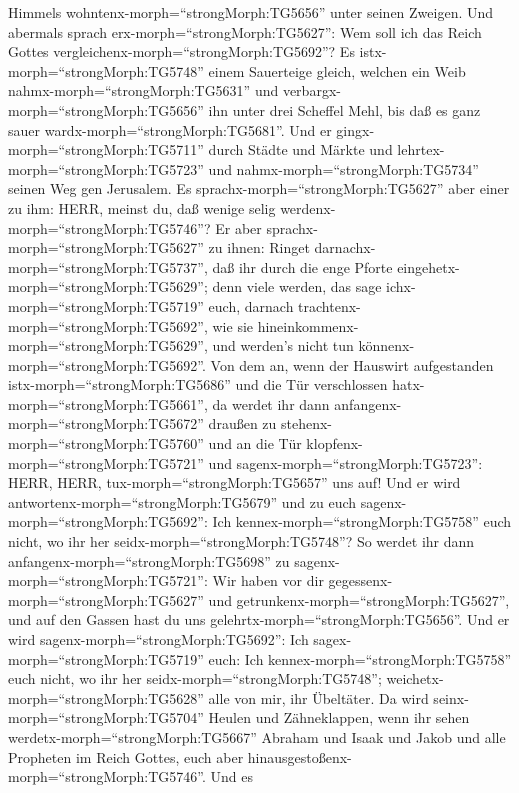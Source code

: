 Himmels wohntenx-morph=``strongMorph:TG5656'' unter seinen Zweigen.
 Und abermals sprach erx-morph=``strongMorph:TG5627'': Wem
soll ich das Reich Gottes vergleichenx-morph=``strongMorph:TG5692''?
 Es istx-morph=``strongMorph:TG5748'' einem Sauerteige
gleich, welchen ein Weib nahmx-morph=``strongMorph:TG5631'' und
verbargx-morph=``strongMorph:TG5656'' ihn unter drei Scheffel Mehl, bis
daß es ganz sauer wardx-morph=``strongMorph:TG5681''.  Und
er gingx-morph=``strongMorph:TG5711'' durch Städte und Märkte und
lehrtex-morph=``strongMorph:TG5723'' und
nahmx-morph=``strongMorph:TG5734'' seinen Weg gen Jerusalem.
 Es sprachx-morph=``strongMorph:TG5627'' aber einer zu ihm:
HERR, meinst du, daß wenige selig werdenx-morph=``strongMorph:TG5746''?
Er aber sprachx-morph=``strongMorph:TG5627'' zu ihnen: 
Ringet darnachx-morph=``strongMorph:TG5737'', daß ihr durch die enge
Pforte eingehetx-morph=``strongMorph:TG5629''; denn viele werden, das
sage ichx-morph=``strongMorph:TG5719'' euch, darnach
trachtenx-morph=``strongMorph:TG5692'', wie sie
hineinkommenx-morph=``strongMorph:TG5629'', und werden's nicht tun
könnenx-morph=``strongMorph:TG5692''.  Von dem an, wenn der
Hauswirt aufgestanden istx-morph=``strongMorph:TG5686'' und die Tür
verschlossen hatx-morph=``strongMorph:TG5661'', da werdet ihr dann
anfangenx-morph=``strongMorph:TG5672'' draußen zu
stehenx-morph=``strongMorph:TG5760'' und an die Tür
klopfenx-morph=``strongMorph:TG5721'' und
sagenx-morph=``strongMorph:TG5723'': HERR, HERR,
tux-morph=``strongMorph:TG5657'' uns auf! Und er wird
antwortenx-morph=``strongMorph:TG5679'' und zu euch
sagenx-morph=``strongMorph:TG5692'': Ich
kennex-morph=``strongMorph:TG5758'' euch nicht, wo ihr her
seidx-morph=``strongMorph:TG5748''?  So werdet ihr dann
anfangenx-morph=``strongMorph:TG5698'' zu
sagenx-morph=``strongMorph:TG5721'': Wir haben vor dir
gegessenx-morph=``strongMorph:TG5627'' und
getrunkenx-morph=``strongMorph:TG5627'', und auf den Gassen hast du uns
gelehrtx-morph=``strongMorph:TG5656''.  Und er wird
sagenx-morph=``strongMorph:TG5692'': Ich
sagex-morph=``strongMorph:TG5719'' euch: Ich
kennex-morph=``strongMorph:TG5758'' euch nicht, wo ihr her
seidx-morph=``strongMorph:TG5748'';
weichetx-morph=``strongMorph:TG5628'' alle von mir, ihr Übeltäter.
 Da wird seinx-morph=``strongMorph:TG5704'' Heulen und
Zähneklappen, wenn ihr sehen werdetx-morph=``strongMorph:TG5667''
Abraham und Isaak und Jakob und alle Propheten im Reich Gottes, euch
aber hinausgestoßenx-morph=``strongMorph:TG5746''.  Und es

